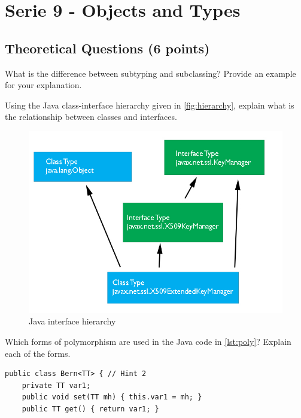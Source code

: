 \documentclass [11pt, a4wide, twoside]{article}
\begin{document}
\section*{
    \xspace{}Serie 9 - Objects and Types}

\subsection{Theoretical Questions (6 points)}

\begin{myenumerate}

\item What is the difference between subtyping and subclassing? Provide an example for your explanation.

\vspace{0.5cm}

\solution{}


\item Using the Java class-interface hierarchy given in \autoref{fig:hierarchy}, explain what is the relationship between classes and interfaces.

\begin{figure}[h!]
\includegraphics[width=0.5\linewidth]{figs/hierarchy.jpg}
\caption{Java interface hierarchy}
\label{fig:hierarchy}
\end{figure}

\vspace{0.5cm}

\solution{}

\item Which forms of polymorphism are used in the Java code in \autoref{lst:poly}? Explain each of the forms.

\begin{lstlisting}[float=h,style=Java,caption={Forms of polymorphism},label=lst:poly]
public class Bern<TT> { // Hint 2
    private TT var1;
    public void set(TT mh) { this.var1 = mh; }
    public TT get() { return var1; }


\end{lstlisting}
\end{myenumerate}
\end{document}

